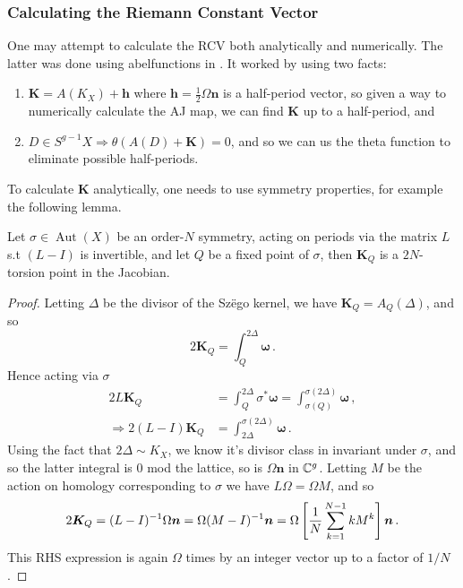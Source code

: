 \documentclass{article}
\begin{document}
\subsubsection{Calculating the Riemann Constant Vector}
One may attempt to calculate the RCV both analytically and numerically. The latter was done using abelfunctions in \cite{Deconinck2015}. It worked by using two facts: 
\begin{enumerate}
	\item $\bm{K} = A(K_X)+ \bm{h}$ where $\bm{h} = \frac{1}{2}\Omega \bm{n}$ is a half-period vector, so given a way to numerically calculate the AJ map, we can find $\bm{K}$ up to a half-period, and 
	\item $D \in S^{g-1}X \Rightarrow \theta(A(D)+\bm{K})=0$, and so we can us the theta function to eliminate possible half-periods.  
\end{enumerate}
To calculate $\bm{K}$ analytically, one needs to use symmetry properties, for example the following lemma. 
\begin{lemma}
	Let $\sigma \in \operatorname{Aut}(X)$ be an order-$N$ symmetry, acting on periods via the matrix $L$ s.t $(L-I)$ is invertible, and let $Q$ be a fixed point of $\sigma$, then $\bm{K}_Q$ is a $2N$-torsion point in the Jacobian. 
\end{lemma}
\begin{proof}
	Letting $\Delta$ be the divisor of the Sz\"ego kernel, we have $\bm{K}_Q = A_Q(\Delta)$, and so 
	\[
	2\bm{K}_Q = \int_Q^{2\Delta} \bm{\omega} \, .
	\]
	Hence acting via $\sigma$ 
	\begin{align*}
	2L\bm{K}_Q  &= \int_Q^{2\Delta} \sigma^\ast \bm{\omega} = \int_{\sigma(Q)}^{\sigma(2\Delta)} \bm{\omega} \, , \\
	\Rightarrow 2 (L-I)\bm{K}_Q &= \int_{2\Delta}^{\sigma(2\Delta)} \bm{\omega} \, .
	\end{align*}
Using the fact that $2\Delta \sim K_X$, we know it's divisor class in invariant under $\sigma$, and so the latter integral is 0 mod the lattice, so is $\Omega \bm{n}$ in $\mathbb{C}^g$. Letting $M$ be the action on homology corresponding to $\sigma$ we have $L\Omega = \Omega M$, and so 
\[
2\bm{K}_Q = (L-I)^{-1} \Omega \bm{n} = \Omega(M-I)^{-1} \bm{n} = \Omega\left[ \frac{1}{N} \sum_{k=1}^{N-1} k M^k \right] \bm{n} \, .
\]
This RHS expression is again $\Omega$ times by an integer vector up to a factor of $1/N$. 
\end{proof}
\end{document}
